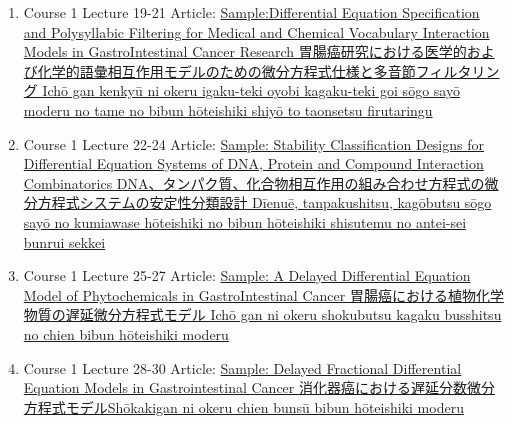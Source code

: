 \documentclass[preprint, 8pt]{elsarticle}
\theoremstyle{definition}
\begin{document}
\begin{CJK}{UTF8}{min}
\begin{enumerate}
\item Course 1  Lecture 19-21 Article: \href{}{Sample:Differential Equation Specification  and Polysyllabic Filtering for Medical and Chemical Vocabulary Interaction Models in GastroIntestinal Cancer Research 胃腸癌研究における医学的および化学的語彙相互作用モデルのための微分方程式仕様と多音節フィルタリング Ichō gan kenkyū ni okeru igaku-teki oyobi kagaku-teki goi sōgo sayō moderu no tame no bibun hōteishiki shiyō to taonsetsu firutaringu}
\item Course 1  Lecture 22-24 Article: \href{}{Sample: Stability Classification Designs for Differential Equation Systems of DNA, Protein and Compound Interaction Combinatorics DNA、タンパク質、化合物相互作用の組み合わせ方程式の微分方程式システムの安定性分類設計 Dīenuē, tanpakushitsu, kagōbutsu sōgo sayō no kumiawase hōteishiki no bibun hōteishiki shisutemu no antei-sei bunrui sekkei}
\item Course 1  Lecture 25-27 Article: \href{}{Sample: A Delayed Differential Equation Model of Phytochemicals in GastroIntestinal Cancer 胃腸癌における植物化学物質の遅延微分方程式モデル Ichō gan ni okeru shokubutsu kagaku busshitsu no chien bibun hōteishiki moderu}
\item Course 1  Lecture 28-30 Article: \href{}{Sample: Delayed Fractional Differential Equation Models in Gastrointestinal Cancer 消化器癌における遅延分数微分方程式モデルShōkakigan ni okeru chien bunsū bibun hōteishiki moderu}
\end{enumerate}

\end{CJK}
\end{document}
